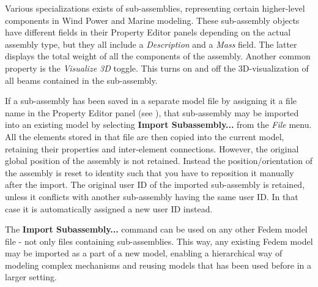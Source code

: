 Various specializations exists of sub-assemblies, representing certain
higher-level components in Wind Power and Marine modeling. These
sub-assembly objects have different fields in their Property Editor
panels depending on the actual assembly type, but they all include a
{\sl Description} and a {\sl Mass} field. The latter displays the
total weight of all the components of the assembly. Another common
property is the {\sl Visualize 3D} toggle. This turns on and off the
3D-visualization of all beams contained in the sub-assembly.



If a sub-assembly has been saved in a separate model file by assigning
it a file name in the Property Editor panel (see
), that
sub-assembly may be imported into an existing model by selecting
\textbf{Import Subassembly...} from the {\sl File} menu. All the
elements stored in that file are then copied into the current model,
retaining their properties and inter-element connections. However, the
original global position of the assembly is not retained. Instead the
position/orientation of the assembly is reset to identity such that you
have to reposition it manually after the import. The original user ID of
the imported sub-assembly is retained, unless it conflicts with another
sub-assembly having the same user ID.
In that case it is automatically assigned a new user ID instead.


The \textbf{Import Subassembly...} command can be used on any other
Fedem model file - not only files containing sub-assemblies. This way,
any existing Fedem model may be imported as a part of a new model,
enabling a hierarchical way of modeling complex mechanisms and reusing
models that has been used before in a larger setting.



